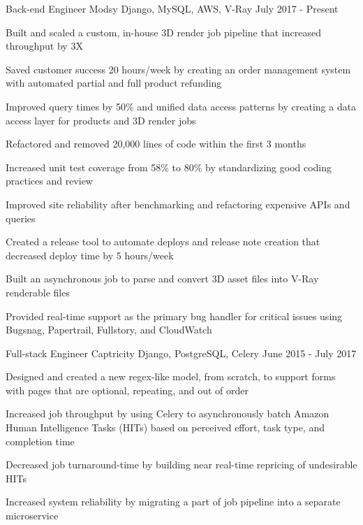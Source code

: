 \begin{cventries}
  \cventry
    {Back-end Engineer}
    {Modsy}
    {Django, MySQL, AWS, V-Ray}
    {July 2017 - Present}
    {
      \begin{cvitems}
        \item {Built and scaled a custom, in-house 3D render job pipeline that increased throughput by 3X}
        \item {Saved customer success 20 hours/week by creating an order management system with automated partial and full product refunding}
        \item {Improved query times by 50\% and unified data access patterns by creating a data access layer for products and 3D render jobs}
        \item {Refactored and removed 20,000 lines of code within the first 3 months}
        \item {Increased unit test coverage from 58\% to 80\% by standardizing good coding practices and review}
        \item {Improved site reliability after benchmarking and refactoring expensive APIs and queries}
        \item {Created a release tool to automate deploys and release note creation that decreased deploy time by 5 hours/week}
        \item {Built an asynchronous job to parse and convert 3D asset files into V-Ray renderable files}
        \item {Provided real-time support as the primary bug handler for critical issues using Bugsnag, Papertrail, Fullstory, and CloudWatch}
      \end{cvitems}
    }
  \cventry
    {Full-stack Engineer}
    {Captricity}
    {Django, PostgreSQL, Celery}
    {June 2015 - July 2017}
    {
      \begin{cvitems}
        \item {Designed and created a new regex-like model, from scratch, to support forms with pages that are optional, repeating, and out of order}
        \item {Increased job throughput by using Celery to asynchronously batch Amazon Human Intelligence Tasks (HITs) based on perceived effort, task type, and completion time}
        \item {Decreased job turnaround-time by building near real-time repricing of undesirable HITs}
        \item {Increased system reliability by migrating a part of job pipeline into a separate microservice}

\end{cvitems}}
\end{cventries}

